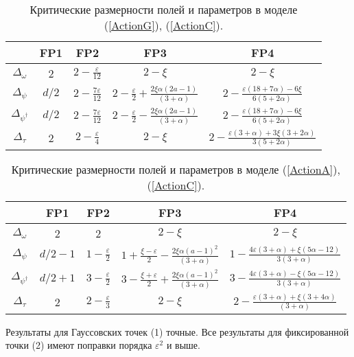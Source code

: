 \documentclass[a4paper,10pt]{article}
\begin{document}
\begin{table}[H]
\caption{Критические размерности полей и параметров в моделе (\protect\ref{ActionG}), (\protect\ref{ActionC}).}
\label{tableG}
\begin{tabular}{|c|c|c|c|c|}
\hline
{} & FP1 & FP2 & FP3 & FP4 \\
\hline
$\Delta_{\omega}$ & 2  & $2-\frac{\varepsilon}{12}$  & $2-\xi$ & $2-\xi$
\\
\hline
$\Delta_{\psi}$ & $d/2$  & $2-\frac{7\varepsilon}{12}$  &
$2-\frac{\varepsilon}{2}+\frac{2\xi\alpha(2a-1)}{(3+\alpha)}$ &
$2- \frac{\varepsilon(18+7\alpha)-6\xi}{6(5+2\alpha)}$ \\
 \hline
$\Delta_{\psi^{\dag}}$ & $d/2$  & $2-\frac{7\varepsilon}{12}$  &
$2-\frac{\varepsilon}{2}-\frac{2\xi\alpha(2a-1)}{(3+\alpha)}$    &
$2- \frac{\varepsilon(18+7\alpha)-6\xi}{6(5+2\alpha)}$ \\
\hline
$\Delta_{\tau}$ & 2  & $2-\frac{\varepsilon}{4}$ & $2-\xi$  &
$2- \frac{\varepsilon(3+\alpha) +3\xi(3+2\alpha)} {3(5+2\alpha)}$ \\
\hline
\end{tabular}
\end{table}

\begin{table}[H]
\caption{Критические размерности полей и параметров в моделе (\protect\ref{ActionA}), (\protect\ref{ActionC}).}
\label{tableA}
\begin{tabular}{|c|c|c|c|c|}
\hline
{} & FP1 & FP2 & FP3 & FP4 \\
\hline
$\Delta_{\omega}$ & 2  & 2  & $2-\xi$ & $2-\xi$ \\
\hline
$\Delta_{\psi}$ & $d/2-1$  & $1-\frac{\varepsilon}{2}$ &
$1+ \frac{\xi-\varepsilon}{2} - \frac{2\xi\alpha(a-1)^{2}} {(3+\alpha)}$ &
$1 - \frac{4\varepsilon(3+\alpha)+\xi(5\alpha-12)}{3(3+\alpha)}$ \\
\hline
$\Delta_{\psi^{\dag}}$ & $d/2+1$  & $3-\frac{\varepsilon}{2}$ &
$3- \frac{\xi+\varepsilon}{2} + \frac{2\xi\alpha(a-1)^{2}} {(3+\alpha)}$ &
$3 - \frac{4\varepsilon(3+\alpha)-\xi(5\alpha-12)}{3(3+\alpha)}$ \\
\hline
$\Delta_{\tau}$ & 2  & $2-\frac{\varepsilon}{3}$  &  $2-\xi$ &
$2- \frac{\varepsilon(3+\alpha)+\xi(3+4\alpha)}{(3+\alpha)}$ \\
\hline
\end{tabular}
\end{table}

Результаты для Гауссовских точек (1) точные. Все результаты для фиксированной точки (2) имеют поправки порядка   $\varepsilon^{2}$ и выше.
\end{document}
